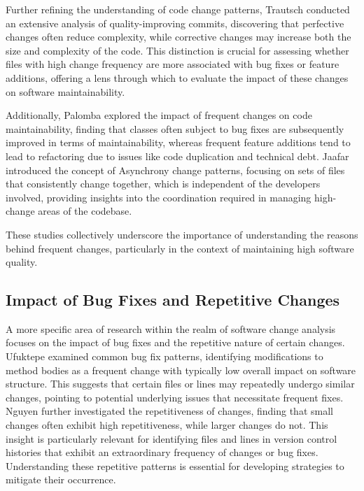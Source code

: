 \documentclass{article}
\begin{document}
Further refining the understanding of code change patterns, Trautsch \cite{trautsch2023really} conducted an extensive analysis of quality-improving commits, discovering that perfective changes often reduce complexity, while corrective changes may increase both the size and complexity of the code. This distinction is crucial for assessing whether files with high change frequency are more associated with bug fixes or feature additions, offering a lens through which to evaluate the impact of these changes on software maintainability.

Additionally, Palomba \cite{palomba2017exploratory} explored the impact of frequent changes on code maintainability, finding that classes often subject to bug fixes are subsequently improved in terms of maintainability, whereas frequent feature additions tend to lead to refactoring due to issues like code duplication and technical debt. Jaafar \cite{jaafar2017analyzing} introduced the concept of Asynchrony change patterns, focusing on sets of files that consistently change together, which is independent of the developers involved, providing insights into the coordination required in managing high-change areas of the codebase.

These studies collectively underscore the importance of understanding the reasons behind frequent changes, particularly in the context of maintaining high software quality. \\ 

\subsection{Impact of Bug Fixes and Repetitive Changes}
A more specific area of research within the realm of software change analysis focuses on the impact of bug fixes and the repetitive nature of certain changes. Ufuktepe\cite{ufuktepe2021relation} examined common bug fix patterns, identifying modifications to method bodies as a frequent change with typically low overall impact on software structure. This suggests that certain files or lines may repeatedly undergo similar changes, pointing to potential underlying issues that necessitate frequent fixes.\\

Nguyen \cite{nguyen2013study} further investigated the repetitiveness of changes, finding that small changes often exhibit high repetitiveness, while larger changes do not. This insight is particularly relevant for identifying files and lines in version control histories that exhibit an extraordinary frequency of changes or bug fixes. Understanding these repetitive patterns is essential for developing strategies to mitigate their occurrence.\\
\end{document}
